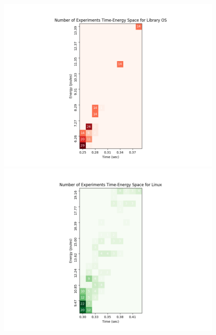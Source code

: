 \documentclass[pageno]{jpaper}
\begin{document}
\begin{figure}
	\includegraphics[width=\columnwidth]{asplos2021_figures/plots3d_netpipe_heatmap_ebbrt_tuned.png}
	\includegraphics[width=\columnwidth]{asplos2021_figures/plots3d_netpipe_heatmap_linux_tuned.png}
\end{figure}
\end{document}
